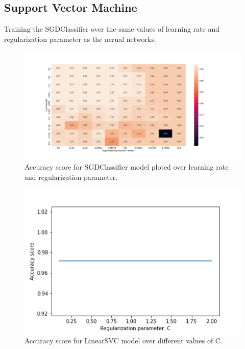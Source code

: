 \documentclass[reprint,english,notitlepage]{revtex4-2}  %
\begin{document}
\subsection{Support Vector Machine}
Training the SGDClassifier over the same values of learning rate and regularization parameter as the nerual networks. 
\begin{figure}[!htb]
	\centering\includegraphics[trim=140 20 100 0, scale=0.3]{SGDClass}
	\caption{Accuracy score for SGDClassifier model ploted over learning rate and regularization parameter.}\label{figure}
\end{figure}
\begin{figure}[!htb]
	\centering\includegraphics[trim=140 20 100 0, scale=0.3]{LinearSVC}
	\caption{Accuracy score for LinearSVC model over different values of C.}\label{figure}
\end{figure}
\end{document}
